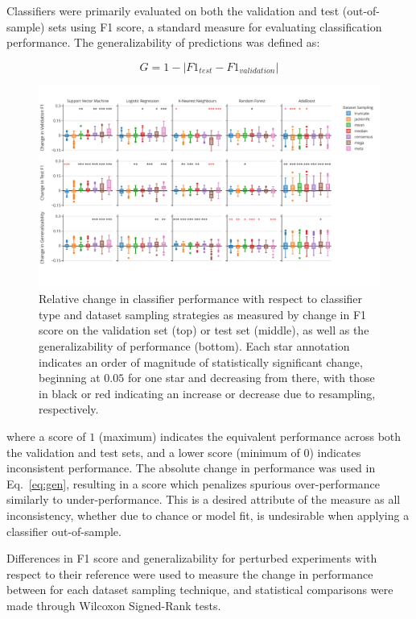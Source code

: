 \documentclass[10pt]{SelfArx} %
\begin{document}
Classifiers were primarily evaluated on both the validation and test (out-of-sample) sets using F1 score, a standard
measure for evaluating classification performance. The generalizability of predictions was defined as:

\begin{equation}
G = 1 - \lvert F1_{test} - F1_{validation} \rvert
\label{eq:gen}
\end{equation}

\begin{figure}[bth!]\centering
\includegraphics[width=\linewidth]{figures/1.pdf}
\caption{Relative change in classifier performance with respect to classifier type and dataset sampling strategies as
measured by change in F1 score on the validation set (top) or test set (middle), as well as the generalizability of
performance (bottom). Each star annotation indicates an order of magnitude of statistically significant change,
beginning at $0.05$ for one star and decreasing from there, with those in black or red indicating an increase or
decrease due to resampling, respectively.}
\label{fig:overall_perf}
\end{figure}

where a score of $1$ (maximum) indicates the equivalent performance across both the validation and test sets, and a
lower score (minimum of $0$) indicates inconsistent performance. The absolute change in performance was used in
Eq.~\ref{eq:gen}, resulting in a score which penalizes spurious over-performance similarly to under-performance. This
is a desired attribute of the measure as all inconsistency, whether due to chance or model fit, is undesirable when
applying a classifier out-of-sample.

Differences in F1 score and generalizability for perturbed experiments with respect to their reference were used to
measure the change in performance between for each dataset sampling technique, and statistical comparisons were made
through Wilcoxon Signed-Rank tests.
\end{document}
